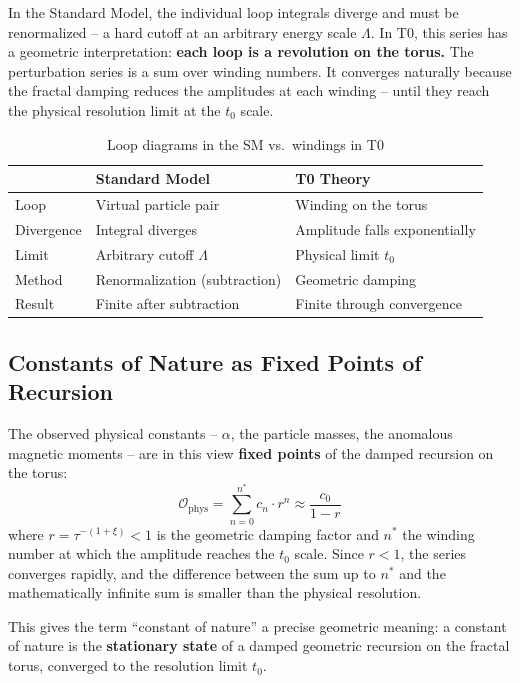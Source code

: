 	In the Standard Model, the individual loop integrals diverge and must be renormalized -- a hard cutoff at an arbitrary energy scale $\Lambda$. In T0, this series has a geometric interpretation: \textbf{each loop is a revolution on the torus.} The perturbation series is a sum over winding numbers. It converges naturally because the fractal damping reduces the amplitudes at each winding -- until they reach the physical resolution limit at the $t_0$ scale.
	
	\begin{table}[h]
		\centering
		\begin{tabular}{lll}
			\toprule
			& \textbf{Standard Model} & \textbf{T0 Theory} \\
			\midrule
			Loop & Virtual particle pair & Winding on the torus \\
			Divergence & Integral diverges & Amplitude falls exponentially \\
			Limit & Arbitrary cutoff $\Lambda$ & Physical limit $t_0$ \\
			Method & Renormalization (subtraction) & Geometric damping \\
			Result & Finite after subtraction & Finite through convergence \\
			\bottomrule
		\end{tabular}
		\caption{Loop diagrams in the SM vs.\ windings in T0}
		\label{tab:loops}
	\end{table}
	
	\subsection{Constants of Nature as Fixed Points of Recursion}
	
	The observed physical constants -- $\alpha$, the particle masses, the anomalous magnetic moments -- are in this view \textbf{fixed points} of the damped recursion on the torus:
	\begin{equation}
		\mathcal{O}_\text{phys} = \sum_{n=0}^{n^*} c_n \cdot r^n \approx \frac{c_0}{1 - r}
	\end{equation}
	where $r = \tau^{-(1+\xi)} < 1$ is the geometric damping factor and $n^*$ the winding number at which the amplitude reaches the $t_0$ scale. Since $r < 1$, the series converges rapidly, and the difference between the sum up to $n^*$ and the mathematically infinite sum is smaller than the physical resolution.
	
	This gives the term ``constant of nature'' a precise geometric meaning: a constant of nature is the \textbf{stationary state} of a damped geometric recursion on the fractal torus, converged to the resolution limit $t_0$.
	
